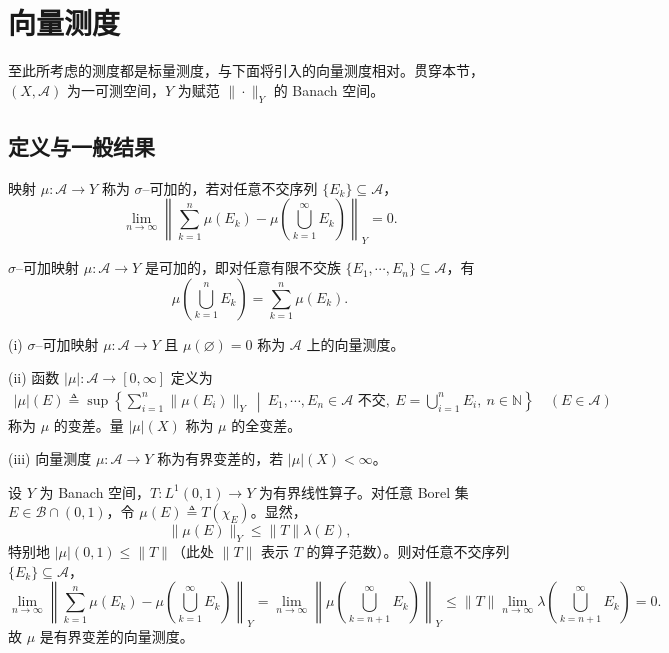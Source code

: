 \documentclass[../../main.tex]{subfiles}%
\begin{document}
\section{向量测度}\label{section:ch01-向量测度}

至此所考虑的测度都是标量测度，与下面将引入的向量测度相对。贯穿本节，$(X,\mathcal{A})$ 为一可测空间，$Y$ 为赋范 $\|\cdot\|_Y$ 的 Banach 空间。

\subsection{定义与一般结果}\label{subsection:ch01-向量测度定义}

\begin{definition}\label{definition:ch01-向量sigma可加}
映射 $\mu:\mathcal{A}\to Y$ 称为 $\sigma$--可加的，若对任意不交序列 $\{E_k\}\subseteq\mathcal{A}$，
\[
\lim_{n\to\infty}\left\|\sum_{k=1}^n\mu(E_k)-\mu\left(\bigcup_{k=1}^\infty E_k\right)\right\|_Y=0.
\]
\end{definition}

\begin{remark}\label{remark:ch01-向量可加}
$\sigma$--可加映射 $\mu:\mathcal{A}\to Y$ 是可加的，即对任意有限不交族 $\{E_1,\cdots ,E_n\}\subseteq\mathcal{A}$，有
\[
\mu\left(\bigcup_{k=1}^n E_k\right)=\sum_{k=1}^n\mu(E_k).
\]
\end{remark}

\begin{definition}\label{definition:ch01-向量测度}
(i) $\sigma$--可加映射 $\mu:\mathcal{A}\to Y$ 且 $\mu(\varnothing )=0$ 称为 $\mathcal{A}$ 上的向量测度。

(ii) 函数 $|\mu|:\mathcal{A}\to[0,\infty]$ 定义为
\begin{align}
|\mu|(E)\triangleq \sup\left\{\sum_{i=1}^n\|\mu(E_i)\|_Y\ \middle|\ E_1,\cdots ,E_n\in\mathcal{A}\text{ 不交},\ E=\bigcup_{i=1}^n E_i,\ n\in\mathbb{N}\right\}\quad(E\in\mathcal{A}) \label{align:ch01-向量变差}
\end{align}
称为 $\mu$ 的变差。量 $|\mu|(X)$ 称为 $\mu$ 的全变差。

(iii) 向量测度 $\mu:\mathcal{A}\to Y$ 称为有界变差的，若 $|\mu|(X)<\infty$。
\end{definition}

\begin{example}\label{example:ch01-向量测度例}
设 $Y$ 为 Banach 空间，$T:L^1(0,1)\to Y$ 为有界线性算子。对任意 Borel 集 $E\in\mathcal{B}\cap(0,1)$，令 $\mu(E)\triangleq T(\chi_E)$。显然，
\[
\|\mu(E)\|_Y\leqslant\|T\|\lambda(E),
\]
特别地 $|\mu|(0,1)\leqslant\|T\|$（此处 $\|T\|$ 表示 $T$ 的算子范数）。则对任意不交序列 $\{E_k\}\subseteq\mathcal{A}$，
\[
\lim_{n\to\infty}\left\|\sum_{k=1}^n\mu(E_k)-\mu\left(\bigcup_{k=1}^\infty E_k\right)\right\|_Y
=\lim_{n\to\infty}\left\|\mu\left(\bigcup_{k=n+1}^\infty E_k\right)\right\|_Y
\leqslant\|T\|\lim_{n\to\infty}\lambda\left(\bigcup_{k=n+1}^\infty E_k\right)=0.
\]
故 $\mu$ 是有界变差的向量测度。
\end{example}
\end{document}
